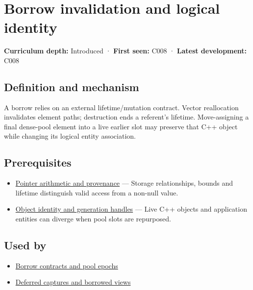 \hypertarget{appendix-f9b8b9188c7f}{}\label{referencestart:appendix-f9b8b9188c7f}
\section{Borrow invalidation and logical identity}\label{appendix-f9b8b9188c7f-borrow-invalidation-and-logical-identity}

\textbf{Curriculum depth:} Introduced · \textbf{First seen:} C008 · \textbf{Latest development:} C008

\subsection{Definition and mechanism}\label{appendix-f9b8b9188c7f-definition-and-mechanism}

A borrow relies on an external lifetime/mutation contract. Vector reallocation invalidates element paths; destruction ends a referent's lifetime. Move-assigning a final dense-pool element into a live earlier slot may preserve that C++ object while changing its logical entity association.

\subsection{Prerequisites}\label{appendix-f9b8b9188c7f-prerequisites}

\begin{itemize}
\tightlist
\item
  \hyperref[appendix-6af5921bc853]{Pointer arithmetic and provenance} --- Storage relationships, bounds and lifetime distinguish valid access from a non-null value.
\item
  \hyperref[appendix-f1581457d322]{Object identity and generation handles} --- Live C++ objects and application entities can diverge when pool slots are repurposed.
\end{itemize}

\subsection{Used by}\label{appendix-f9b8b9188c7f-used-by}

\begin{itemize}
\tightlist
\item
  \hyperref[appendix-aa405b7c3903]{Borrow contracts and pool epochs}
\item
  \hyperref[appendix-aea529eb5175]{Deferred captures and borrowed views}
\end{itemize}

